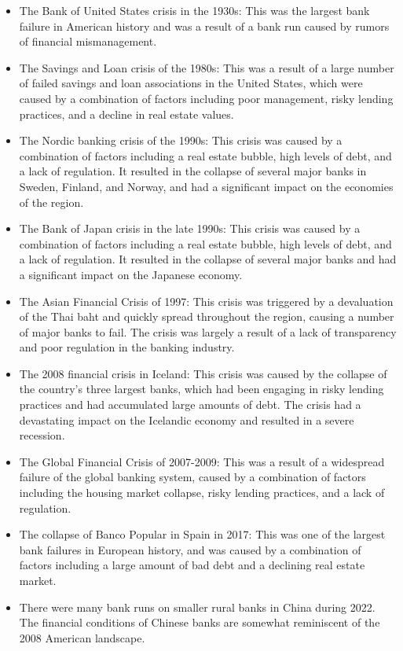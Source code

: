 \begin{itemize}
\item The Bank of United States crisis in the 1930s: This was the largest bank failure in American history and was a result of a bank run caused by rumors of financial mismanagement.
\item The Savings and Loan crisis of the 1980s: This was a result of a large number of failed savings and loan associations in the United States, which were caused by a combination of factors including poor management, risky lending practices, and a decline in real estate values.
\item The Nordic banking crisis of the 1990s: This crisis was caused by a combination of factors including a real estate bubble, high levels of debt, and a lack of regulation. It resulted in the collapse of several major banks in Sweden, Finland, and Norway, and had a significant impact on the economies of the region.
\item The Bank of Japan crisis in the late 1990s: This crisis was caused by a combination of factors including a real estate bubble, high levels of debt, and a lack of regulation. It resulted in the collapse of several major banks and had a significant impact on the Japanese economy.
\item The Asian Financial Crisis of 1997: This crisis was triggered by a devaluation of the Thai baht and quickly spread throughout the region, causing a number of major banks to fail. The crisis was largely a result of a lack of transparency and poor regulation in the banking industry.
\item The 2008 financial crisis in Iceland: This crisis was caused by the collapse of the country's three largest banks, which had been engaging in risky lending practices and had accumulated large amounts of debt. The crisis had a devastating impact on the Icelandic economy and resulted in a severe recession.
\item The Global Financial Crisis of 2007-2009: This was a result of a widespread failure of the global banking system, caused by a combination of factors including the housing market collapse, risky lending practices, and a lack of regulation.
\item The collapse of Banco Popular in Spain in 2017: This was one of the largest bank failures in European history, and was caused by a combination of factors including a large amount of bad debt and a declining real estate market.
\item There were many bank runs on smaller rural banks in China during 2022. The financial conditions of Chinese banks are somewhat reminiscent of the 2008 American landscape.
\end{itemize}
